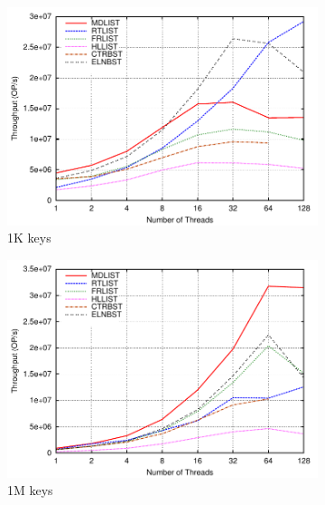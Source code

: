 \documentclass[10pt,conference,compsocconf]{IEEEtran}
\begin{document}
\begin{figure}[t]
    \begin{subfigure}{0.32\textwidth}
        \centering
        \includegraphics[width=1\columnwidth]{./data/amd50ins1Kkey}
        \caption{1K keys}
        \label{fig:1k50ins}
    \end{subfigure}
    \hfill
    \begin{subfigure}{0.32\textwidth}
        \centering
        \includegraphics[width=1\columnwidth]{./data/amd50ins1Mkey}
        \caption{1M keys}
        \label{fig:1m50ins}
    \end{subfigure}
    \hfill
    \begin{subfigure}{0.32\textwidth}
        \centering

\end{subfigure}
\end{figure}
\end{document}

